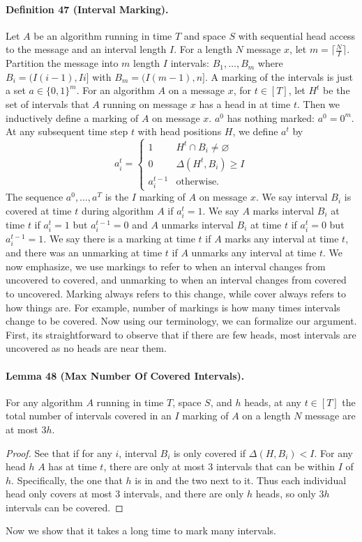 \paragraph{Definition 47 (Interval Marking).} Let $A$ be an algorithm running in time $T$ and space $S$ with sequential head access to the message and an interval length $I$.
For a length $N$ message $x$, let $m=\lceil\frac NI\rceil$. Partition the message into $m$ length $I$ intervals: $B_1,\ldots,B_m$ where $B_i=(I(i-1),Ii]$ with $B_m=(I(m-1),n]$. A marking of the intervals is just a set $a\in\{0,1\}^m$.
For an algorithm $A$ on a message $x$, for $t\in[T]$, let $H^t$ be the set of intervals that $A$ running on message $x$ has a head in at time $t$.
Then we inductively define a marking of $A$ on message $x$. $a^0$ has nothing marked: $a^0=0^m$. At any subsequent time step $t$ with head positions $H$, we define $a^t$ by
\[a_i^t=\begin{cases}1&H^t\cap B_i\ne\varnothing\\0&\Delta(H^t,B_i)\ge I\\a_i^{t-1}&\text{otherwise.}\end{cases}\]
The sequence $a^0,\ldots,a^T$ is the $I$ marking of $A$ on message $x$.
We say interval $B_i$ is covered at time $t$ during algorithm $A$ if $a_i^t=1$. We say $A$ marks interval $B_i$ at time $t$ if $a_i^t=1$ but $a_i^{t-1}=0$ and $A$ unmarks interval $B_i$ at time $t$ if $a_i^t=0$ but $a_i^{t-1}=1$. We say there is a marking at time $t$ if $A$ marks any interval at time $t$, and there was an unmarking at time $t$ if $A$ unmarks any interval at time $t$.
We now emphasize, we use markings to refer to when an interval changes from uncovered to covered, and unmarking to when an interval changes from covered to uncovered. Marking always refers to this change, while cover always refers to how things are. For example, number of markings is how many times intervals change to be covered.
Now using our terminology, we can formalize our argument. First, its straightforward to observe that if there are few heads, most intervals are uncovered as no heads are near them.
\paragraph{Lemma 48 (Max Number Of Covered Intervals).} For any algorithm $A$ running in time $T$, space $S$, and $h$ heads, at any $t\in[T]$ the total number of intervals covered in an $I$ marking of $A$ on a length $N$ message are at most $3h$.
\begin{proof}
See that if for any $i$, interval $B_i$ is only covered if $\Delta(H,B_i)<I$. For any head $h$ $A$ has at time $t$, there are only at most 3 intervals that can be within $I$ of $h$. Specifically, the one that $h$ is in and the two next to it. Thus each individual head only covers at most 3 intervals, and there are only $h$ heads, so only $3h$ intervals can be covered.
\end{proof}
Now we show that it takes a long time to mark many intervals.
